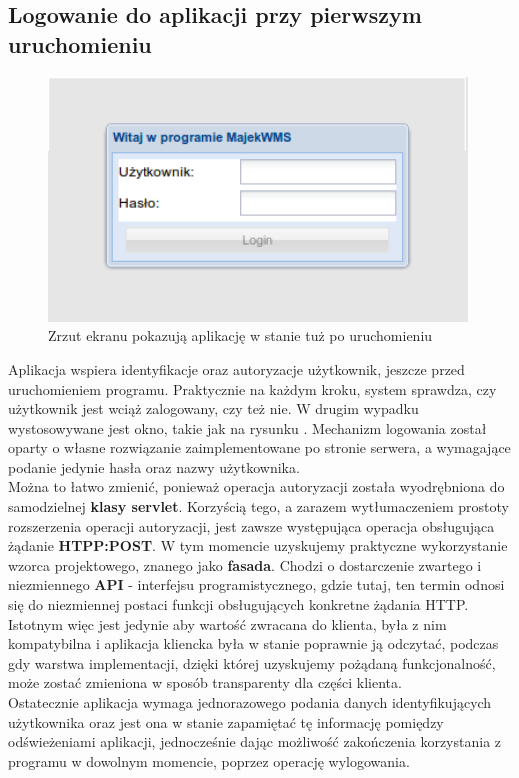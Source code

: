 	\subsection{Logowanie do aplikacji przy pierwszym uruchomieniu}
		\begin{figure}[H]
			\centering
			\includegraphics[width=0.99\textwidth]{images/app/login}
			\caption[Aplikacja - Logowanie do programu]{Zrzut ekranu pokazują aplikację w stanie tuż po uruchomieniu}
			\label{c7:fig:app:login}
		\end{figure}
		Aplikacja wspiera identyfikacje oraz autoryzacje użytkownik, jeszcze przed uruchomieniem programu. Praktycznie
		na każdym kroku, system sprawdza, czy użytkownik jest wciąż zalogowany, czy też nie. W drugim wypadku
		wystosowywane jest okno, takie jak na rysunku \label{c7:fig:app::login}. Mechanizm logowania został oparty
		o własne rozwiązanie zaimplementowane po stronie serwera, a wymagające podanie jedynie hasła oraz 
		nazwy użytkownika.\\ Można to łatwo zmienić, ponieważ operacja autoryzacji została wyodrębniona
		do samodzielnej \textbf{klasy servlet}. Korzyścią tego, a zarazem wytłumaczeniem prostoty rozszerzenia
		operacji autoryzacji, jest zawsze występująca operacja obsługująca żądanie \textbf{HTPP:POST}.
		W tym momencie uzyskujemy praktyczne wykorzystanie wzorca projektowego, znanego jako \textbf{fasada}.
		Chodzi o dostarczenie zwartego i niezmiennego \textbf{API} - interfejsu programistycznego, gdzie tutaj, ten termin odnosi się
		do niezmiennej postaci funkcji obsługujących konkretne żądania HTTP.
		Istotnym więc jest jedynie aby wartość zwracana do klienta, była
		z nim kompatybilna i aplikacja kliencka była w stanie poprawnie ją odczytać, podczas gdy warstwa
		implementacji, dzięki której uzyskujemy pożądaną funkcjonalność,
		może zostać zmieniona w sposób transparenty dla części klienta. \\
		Ostatecznie aplikacja wymaga jednorazowego podania danych identyfikujących użytkownika oraz
		jest ona w stanie zapamiętać tę informację pomiędzy odświeżeniami aplikacji, jednocześnie
		dając możliwość zakończenia korzystania z programu w dowolnym momencie, poprzez operację
		wylogowania.
		
